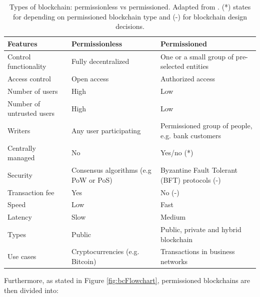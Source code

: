 \begin{table}[bth]
	\myfloatalign \footnotesize
	\begin{tabularx}{\textwidth}{>{\raggedright\arraybackslash}p{4cm} >{\raggedright\arraybackslash}p{6cm}>{\raggedright\arraybackslash}p{6cm}}
	\textbf{Features} & \textbf{Permissionless} & \textbf{Permissioned}\\ 
		\hline
		Control functionality & Fully decentralized & One or a small group of pre-selected entities \\
		Access control & Open access & Authorized access \\ 
		Number of users & High & Low \\
		Number of untrusted users & High & Low \\
		Writers & Any user participating & Permissioned group of people, e.g. bank customers \\
		Centrally managed & No & Yes/no (*) \\
		Security & Consensus algorithms (e.g PoW or PoS) & Byzantine Fault Tolerant (BFT) protocols (-) \\
		Transaction fee & Yes & No (-) \\
		Speed & Low & Fast \\
		Latency & Slow & Medium \\
		Types & Public & Public, private and hybrid blockchain \\
		Use cases & Cryptocurrencies (e.g. Bitcoin) & Transactions in business networks \\ \hline
	\end{tabularx}
		\caption{Types of blockchain: permissionless vs permissioned. Adapted from \citep{wust2017you}. (*) states for depending on permissioned blockchain type and (-) for blockchain design decisions.}
	\label{tab:blockchainTypes}
\end{table}

Furthermore, as stated in Figure \ref{fig:bcFlowchart}, permissioned blockchains are then divided into:

